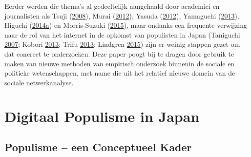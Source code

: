 \documentclass[10.5pt,dutch,]{article}
\begin{document}
Eerder werden die thema's al gedeeltelijk aangehaald door academici en
journalisten als Tsuji
(\protect\hyperlink{ref-tsujiux5fintanettoux5f2008}{2008}), Murai
(\protect\hyperlink{ref-muraiux5fnetux5f2012}{2012}), Yasuda
(\protect\hyperlink{ref-yasudaux5fnettoux5f2012}{2012}), Yamaguchi
(\protect\hyperlink{ref-yamaguchiux5fxenophobiaux5f2013}{2013}), Higuchi
(\protect\hyperlink{ref-higuchiux5fjapansux5f2014}{2014}\protect\hyperlink{ref-higuchiux5fjapansux5f2014}{a})
en Morris-Suzuki
(\protect\hyperlink{ref-morris-suzukiux5fbeyondux5f2015}{2015}), maar
ondanks een frequente verwijzing naar de rol van het internet in de
opkomst van populisten in Japan (Taniguchi
\protect\hyperlink{ref-taniguchiux5fchangingux5f2007}{2007}; Kobori
\protect\hyperlink{ref-koboriux5fpopulismux5f2013}{2013}; Trifu
\protect\hyperlink{ref-trifuux5fprefecturalux5f2013}{2013}; Lindgren
\protect\hyperlink{ref-lindgrenux5fdevelopingux5f2015}{2015}) zijn er
weinig stappen gezet om dat concreet te onderzoeken. Deze paper poogt
bij te dragen door gebruik te maken van nieuwe methoden van empirisch
onderzoek binnenin de sociale en politieke wetenschappen, met name die
uit het relatief nieuwe domein van de sociale netwerkanalyse.

\newpage

\section{Digitaal Populisme in Japan}\label{digitaal-populisme-in-japan}

\subsection{Populisme -- een Conceptueel
Kader}\label{populisme-een-conceptueel-kader}
\end{document}

